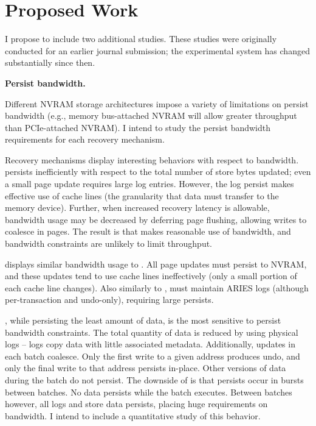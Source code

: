 \section{Proposed Work}
\label{sec:OLTP_eval:Proposed}

I propose to include two additional studies.
These studies were originally conducted for an earlier journal submission; the experimental system has changed substantially since then.

\textbf{Persist bandwidth.}

Different NVRAM storage architectures impose a variety of limitations on persist bandwidth (e.g., memory bus-attached NVRAM will allow greater throughput than PCIe-attached NVRAM).
I intend to study the persist bandwidth requirements for each recovery mechanism.

Recovery mechanisms display interesting behaviors with respect to bandwidth.
\NVDisk persists inefficiently with respect to the total number of store bytes updated; even a small page update requires large log entries.
However, the log persist makes effective use of cache lines (the granularity that data must transfer to the memory device).
Further, when increased recovery latency is allowable, bandwidth usage may be decreased by deferring page flushing, allowing writes to coalesce in pages.
The result is that \NVDisk makes reasonable use of bandwidth, and bandwidth constraints are unlikely to limit throughput.

\InPlace displays similar bandwidth usage to \NVDisk.
All page updates must persist to NVRAM, and these updates tend to use cache lines ineffectively (only a small portion of each cache line changes).
Also similarly to \NVDisk, \InPlace must maintain ARIES logs (although per-transaction and undo-only), requiring large persists.

\GroupCommit, while persisting the least amount of data, is the most sensitive to persist bandwidth constraints.
The total quantity of data is reduced by using physical logs -- logs copy data with little associated metadata.
Additionally, updates in each batch coalesce.
Only the first write to a given address produces undo, and only the final write to that address persists in-place.
Other versions of data during the batch do not persist.
The downside of \GroupCommit is that persists occur in bursts between batches.
No data persists while the batch executes.
Between batches however, all logs and store data persists, placing huge requirements on bandwidth.
I intend to include a quantitative study of this behavior.

